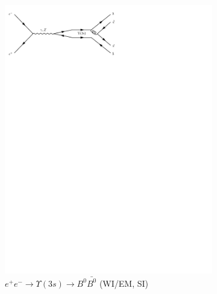\begin{figure}[h]
\begin{subfigure}[b]{0.3\textwidth}
    \includegraphics[trim={0.5cm 22cm 10cm 0cm},width=\textwidth]{../Diagrams/D15.pdf}
    \caption{$e^+e^-\rightarrow \Upsilon(3s)\rightarrow B^0\bar{B^0}$ (WI/EM, SI)}
    \label{fey:15}
  \end{subfigure}
  \newline
  \newline
  \begin{subfigure}[b]{0.3\textwidth}

\end{subfigure}
\end{figure}
